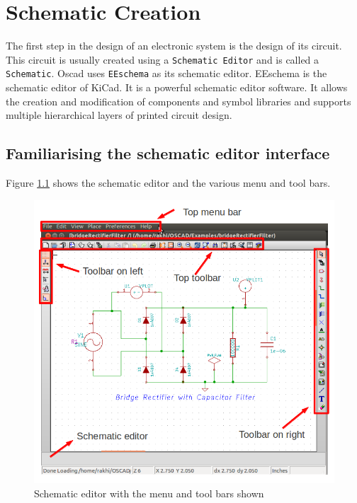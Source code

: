 
%

\chapter{Schematic Creation}
\label{chap5}
The first step in the design of an electronic system is the design of its circuit. This circuit is usually created using a {\tt Schematic Editor} and is called a {\tt Schematic}. Oscad uses {\tt EEschema}  as its schematic editor. EEschema is the schematic editor of KiCad. It is a powerful schematic editor software. It allows the creation and  modification of components and symbol libraries and supports multiple hierarchical layers of printed circuit design.

\section{Familiarising the schematic editor interface}
Figure \ref{eesch1} shows the schematic editor and the various menu and tool bars. 
\begin{figure}
\begin{center}
\includegraphics[width=\linewidth]{figures/eeschema1_corctd.png}%
\caption{Schematic editor with the menu and tool bars shown}
\label{eesch1}
\end{center}
\end{figure}



